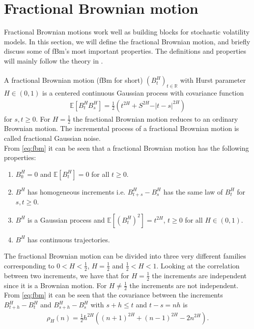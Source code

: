 \documentclass{article}
\begin{document}
\section{Fractional Brownian motion} \label{sec:fbm}
Fractional Brownian motions work well as building blocks for stochastic volatility models. In this section, we will define the fractional Brownian motion, and briefly discuss some of fBm's most important properties. The definitions and properties will mainly follow the theory in \cite{biagini2008}.\\\\ 
A fractional Brownian motion (fBm for short) $(B_t^H)_{t\in\mathbb{R}}$ with Hurst parameter $H\in(0,1)$ is a centered continuous Gaussian process with covariance function
\begin{align}
\mathbb{E}\left[B_t^HB_s^H\right] = \frac{1}{2}\left(t^{2H}+S^{2H}-\vert t-s\vert ^{2H} \right) \label{eq:fbm}
\end{align}
for $s,t\geq 0$. For $H = \frac{1}{2}$ the fractional Brownian motion reduces to an ordinary Brownian motion. The incremental process of a fractional Brownian motion is called fractional Gaussian noise.\\
From \eqref{eq:fbm} it can be seen that a fractional Brownian motion has the following properties:
\begin{enumerate}
    \item $B_0^H = 0$ and $\mathbb{E}[B^H_t] = 0$ for all $t\geq 0$.
    \item $B^H$ has homogeneous increments i.e. $B^H_{t+s}-B^H_s$ has the same law of $B^H_t$ for $s,t\geq0$.
    \item $B^H$ is a Gaussian process and $\mathbb{E}[(B^H_t)^2]=t^{2H}$, $t\geq 0$ for all $H\in (0,1)$.
    \item $B^H$ has continuous trajectories.
\end{enumerate}
The fractional Brownian motion can be divided into three very different families corresponding to $0<H<\frac{1}{2}$, $H=\frac{1}{2}$ and $\frac{1}{2}<H<1$. Looking at the correlation between two increments, we have that for $H=\frac{1}{2}$ the increments are independent since it is a Brownian motion. For $H\neq \frac{1}{2}$ the increments are not independent. From \eqref{eq:fbm} it can be seen that the covariance between the increments $B^H_{t+h}-B^H_{t}$ and $B^H_{s+h}-B^H_{s}$ with $s+h\leq t$ and $t-s=nh$ is
\begin{align*}
\rho_H(n) = \frac{1}{2}h^{2H} \left( (n+1)^{2H} +(n-1)^{2H} -2n^{2H}\right).
\end{align*}
\end{document}
